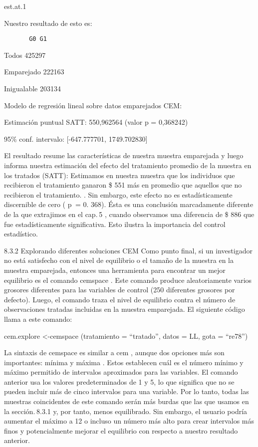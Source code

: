\documentclass[
]{book}
\begin{document}
est.at.1

Nuestro resultado de esto es:

\begin{verbatim}
       G0 G1
\end{verbatim}

Todos 425297

Emparejado 222163

Inigualable 203134

Modelo de regresión lineal sobre datos emparejados CEM:

Estimación puntual SATT: 550,962564 (valor p = 0,368242)

95\% conf. intervalo: {[}-647.777701, 1749.702830{]}

El resultado resume las características de nuestra muestra emparejada y luego informa nuestra estimación del efecto del tratamiento promedio de la muestra en los tratados (SATT): Estimamos en nuestra muestra que los individuos que recibieron el tratamiento ganaron \$ 551 más en promedio que aquellos que no recibieron el tratamiento. . Sin embargo, este efecto no es estadísticamente discernible de cero ( p  = 0. 368). Ésta es una conclusión marcadamente diferente de la que extrajimos en el cap. 5 , cuando observamos una diferencia de \$ 886 que fue estadísticamente significativa. Esto ilustra la importancia del control estadístico.

8.3.2 Explorando diferentes soluciones CEM
Como punto final, si un investigador no está satisfecho con el nivel de equilibrio o el tamaño de la muestra en la muestra emparejada, entonces una herramienta para encontrar un mejor equilibrio es el comando cemspace . Este comando produce aleatoriamente varios grosores diferentes para las variables de control (250 diferentes grosores por defecto). Luego, el comando traza el nivel de equilibrio contra el número de observaciones tratadas incluidas en la muestra emparejada. El siguiente código llama a este comando:

cem.explore \textless-cemspace (tratamiento = ``tratado'', datos = LL, gota = ``re78'')

La sintaxis de cemspace es similar a cem , aunque dos opciones más son importantes: mínima y máxima . Estos establecen cuál es el número mínimo y máximo permitido de intervalos aproximados para las variables. El comando anterior usa los valores predeterminados de 1 y 5, lo que significa que no se pueden incluir más de cinco intervalos para una variable. Por lo tanto, todas las muestras coincidentes de este comando serán más burdas que las que usamos en la sección. 8.3.1 y, por tanto, menos equilibrado. Sin embargo, el usuario podría aumentar el máximo a 12 o incluso un número más alto para crear intervalos más finos y potencialmente mejorar el equilibrio con respecto a nuestro resultado anterior.
\end{document}
